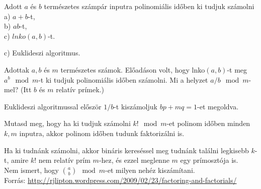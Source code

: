 \begin{Exercise}[counter={sorszam}, difficulty=0]
	Adott $a$ \'es $b$ term\'eszetes sz\'amp\'ar inputra polinomi\'alis id\H oben ki tudjuk sz\'amolni\\
	a) $a+b$-t,\\
	b) $ab$-t,\\
	c) $lnko(a,b)$-t.
\end{Exercise}	
\begin{Answer}
	c) Euklideszi algoritmus.
\end{Answer}

\begin{Exercise}[counter={sorszam}, difficulty=0]
	Adottak $a, b$ \'es $m$ term\'eszetes sz\'amok.
	El\H oad\'ason volt, hogy lnko$(a,b)$-t meg $a^b \mod m$-t ki tudjuk polinomi\'alis id\H oben sz\'amolni.
	Mi a helyzet $a/b \mod m$-mel? (Itt $b$ \'es $m$ relat\'iv pr\'imek.)
\end{Exercise}	
\begin{Answer}
	Euklideszi algoritmussal el\H osz\"or $1/b$-t kisz\'amoljuk $bp + mq = 1$-et megoldva.
\end{Answer}

\begin{Exercise}[counter={sorszam}, difficulty=0]
	Mutasd meg, hogy ha ki tudjuk sz\'amolni $k! \mod m$-et polinom id\H oben minden $k, m$ inputra, akkor polinom id\H oben tudunk faktoriz\'alni is.
\end{Exercise}	
\begin{Answer}
	Ha ki tudn\'ank sz\'amolni, akkor bin\'aris keres\'essel meg tudn\'ank tal\'alni legkisebb $k$-t, amire $k!$ nem relat\'iv pr\'im $m$-hez, \'es ezzel meglenne $m$ egy pr\'imoszt\'oja is.\\
	Nem ismert, hogy ${a \choose b} \mod m$-et milyen neh\'ez kisz\'am\'itani.\\
	Forr\'as: \url{http://rjlipton.wordpress.com/2009/02/23/factoring-and-factorials/}
\end{Answer}


